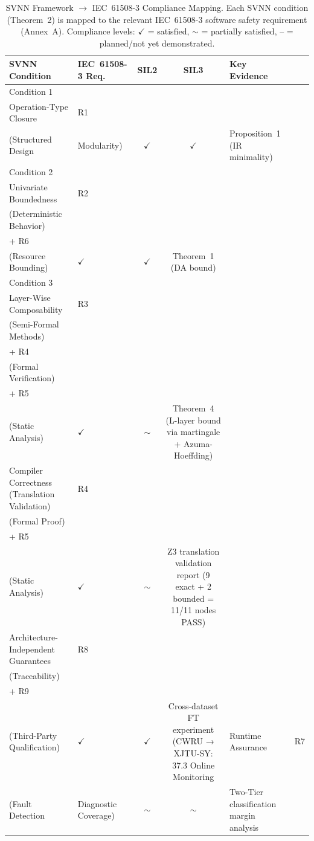 \begin{table}[t]
\centering
\caption{SVNN Framework $\rightarrow$ IEC~61508-3 Compliance Mapping. Each SVNN condition (Theorem~2) is mapped to the relevant IEC~61508-3 software safety requirement (Annex~A). Compliance levels: $\checkmark$ = satisfied, $\sim$ = partially satisfied, -- = planned/not yet demonstrated.}
\label{tab:iec61508_mapping}
\small
\begin{tabular}{p{3.2cm}p{2.8cm}ccp{2.8cm}}
\toprule
\textbf{SVNN Condition} & \textbf{IEC~61508-3 Req.} & \textbf{SIL2} & \textbf{SIL3} & \textbf{Key Evidence} \\
\midrule
  Condition 1\\ Operation-Type Closure & R1\\(Structured Design & Modularity) & $\checkmark$ & $\checkmark$ & Proposition~1 (IR minimality) \\
  Condition 2\\ Univariate Boundedness & R2\\(Deterministic Behavior)\\+ R6\\(Resource Bounding) & $\checkmark$ & $\checkmark$ & Theorem~1 (DA bound) \\
  Condition 3\\ Layer-Wise Composability & R3\\(Semi-Formal Methods)\\+ R4\\(Formal Verification)\\+ R5\\(Static Analysis) & $\checkmark$ & $\sim$ & Theorem~4 (L-layer bound via martingale + Azuma-Hoeffding) \\
  Compiler Correctness (Translation Validation) & R4\\(Formal Proof)\\+ R5\\(Static Analysis) & $\checkmark$ & $\sim$ & Z3 translation validation report (9 exact + 2 bounded = 11/11 nodes PASS) \\
  Architecture-Independent Guarantees & R8\\(Traceability)\\+ R9\\(Third-Party Qualification) & $\checkmark$ & $\checkmark$ & Cross-dataset FT experiment (CWRU → XJTU-SY: 37.3%
  Online Monitoring & Runtime Assurance & R7\\(Fault Detection & Diagnostic Coverage) & $\sim$ & $\sim$ & Two-Tier classification margin analysis \\
\bottomrule
\end{tabular}
\end{table}

